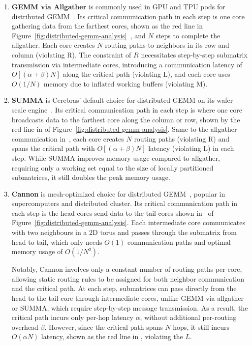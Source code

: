\begin{enumerate}[label=(\arabic*), leftmargin=0.5cm, noitemsep,topsep=0pt]
\item \textbf{GEMM via Allgather} is commonly used in GPU and TPU pods for distributed GEMM~\cite{google2023efficiently, tensorrt-llm, megatron}. Its critical communication path in each step is one core gathering data from the farthest cores, shown as the red line in Figure~\ref{fig:distributed-gemm-analysis}~, and $N$ steps to complete the allgather. Each core creates $N$ routing paths to neighbors in its row and column (violating R). The constraint of $R$ necessitates step-by-step submatrix transmission via intermediate cores, introducing a communication latency of $O[(\alpha + \beta)N]$ along the critical path (violating L), and each core uses $O(1/N)$ memory due to inflated working buffers (violating M).

\item \textbf{SUMMA} is Cerebras' default choice for distributed GEMM on its wafer-scale engine~\cite{cerebrasgemm}. Its critical communication path in each step is where one core broadcasts data to the farthest core along the column or row, shown by the red line in  of Figure~\ref{fig:distributed-gemm-analysis}. Same to the allgather communication in~, each core creates $N$ routing paths (violating R) and spans the critical path with $O[(\alpha + \beta)N]$ latency (violating L) in each step. While SUMMA improves memory usage compared to allgather, requiring only a working set equal to the size of locally partitioned submatrices, it still doubles the peak memory usage.

\item \textbf{Cannon} is mesh-optimized choice for distributed GEMM~\cite{cannon}, popular in supercomputers and distributed cluster. Its critical communication path in each step is the head cores send data to the tail cores shown in~ of Figure~\ref{fig:distributed-gemm-analysis}. Each intermediate core communicates with two neighbours in a 2D torus and passes through the submatrix from head to tail, which only needs $O(1)$ communication paths and optimal memory usage of $O(1/N^2)$. 

Notably, Cannon involves only a constant number of routing paths per core, allowing static routing rules to be assigned for both neighbor communication and the critical path. At each step, submatrices can pass directly from the head to the tail core through intermediate cores, unlike GEMM via allgather or SUMMA, which require step-by-step message transmission. As a result, the critical path incurs only per-hop latency $\alpha$, without additional per-routing overhead $\beta$. However, since the critical path spans $N$ hops, it still incurs $O(\alpha N)$ latency, shown as the red line in , violating the $L$.


\end{enumerate}
